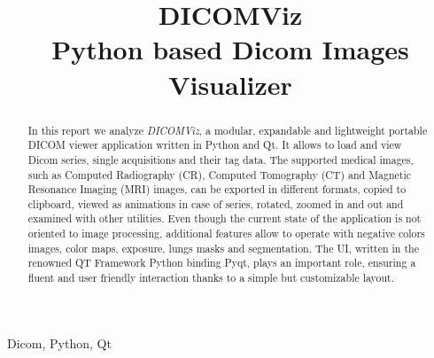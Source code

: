 \documentclass[conference]{IEEEtran}
\begin{document}
\title{DICOMViz  \\ \LARGE Python based Dicom Images Visualizer}

\author{
}

\maketitle
\begin{abstract}
In this report we analyze \textit{DICOMViz}, a modular, expandable and lightweight portable DICOM viewer application written in Python and Qt. It allows to load and view Dicom series, single acquisitions and their tag data. The supported medical images, such as Computed Radiography (CR), Computed Tomography (CT) and Magnetic Resonance Imaging (MRI) images, can be exported in different formats, copied to clipboard, viewed as animations in case of series, rotated, zoomed in and out and examined with other utilities. Even though the current state of the application is not oriented to image processing, additional features allow to operate with negative colors images, color maps, exposure, lungs masks and segmentation. The UI, written in the renowned QT Framework Python binding Pyqt, plays an important role, ensuring a fluent and user friendly interaction thanks to a simple but customizable layout.
\end{abstract}

\begin{IEEEkeywords}
Dicom, Python, Qt
\end{IEEEkeywords}
\end{document}
